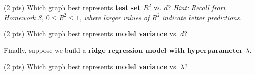 \documentclass[twoside,12pt]{article}
\begin{document}
\begin{probset}
\begin{prob}[(14 pts)]
\begin{subprobset}
\begin{subprob}
\end{subprob}

\begin{subprob}(2 pts) Which graph best represents \textbf{test set $R^2$} vs. $d$? \textit{Hint: Recall from Homework 8, $0 \leq R^2 \leq 1$, where larger values of $R^2$ indicate better predictions.}




    

    
\end{subprob}

\begin{subprob}(2 pts) Which graph best represents \textbf{model variance} vs. $d$?




    


\end{subprob}

\end{subprobset}

Finally, suppose we build a \textbf{ridge regression model with hyperparameter $\lambda$}.

\begin{subprobset}

\begin{subprob}(2 pts) Which graph best represents \textbf{model variance} vs. $\lambda$?




    

    
\end{subprob}
    
\end{subprobset}

\end{prob}

\newpage

\begin{prob}[(9 pts)]


\end{prob}
\end{probset}
\end{document}
